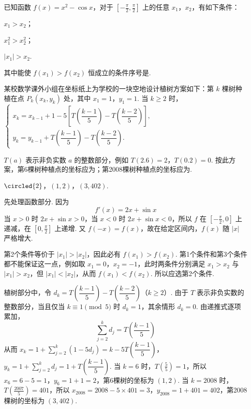 \begin{problem}
已知函数 \( f(x) = x^2 - \cos x \)，对于 \( \left[-\frac{\pi}{2}, \frac{\pi}{2}\right] \) 上的任意 \(x_1\)，\(x_2\)，有如下条件：

\begin{circlelist}
\item \( x_1 > x_2 \)；
\item \( x_1^2 > x_2^2 \)；
\item \( |x_1| > x_2 \).
\end{circlelist}

其中能使 \( f(x_1) > f(x_2) \) 恒成立的条件序号是\fillinblank{}.

某校数学课外小组在坐标纸上为学校的一块空地设计植树方案如下：第 \( k \) 棵树种植在点 \( P_k(x_k,y_k) \) 处，其中 \( x_1=1 \)，\( y_1=1 \). 当 \( k\geqslant2 \) 时，
\(\begin{cases}
x_k=x_{k-1}+1-5\left[T\left(\dfrac{k-1}{5}\right)-T\left(\dfrac{k-2}{5}\right)\right],\\
y_k=y_{k-1}+T\left(\dfrac{k-1}{5}\right)-T\left(\dfrac{k-2}{5}\right).
\end{cases}\)

\( T(a) \) 表示非负实数 \( a \) 的整数部分，例如 \( T(2.6)=2 \)，\( T(0.2)=0 \). 按此方案，第6棵树种植点的坐标应为\fillinblank{}；第2008棵树种植点的坐标应为\fillinblank{}.
\end{problem}

\begin{answer}
\(\circled{2}\)，\((1,2)\)，\((3,402)\).
\end{answer}

\begin{solution}
先处理函数部分. 因为
\[
f'(x)=2x+\sin x
\]
当 \(x>0\) 时 \(2x+\sin x>0\)，当 \(x<0\) 时 \(2x+\sin x<0\)，所以 \(f\) 在 \([-\frac\pi2,0]\) 上递减，在 \([0,\frac\pi2]\) 上递增. 又 \(f(-x)=f(x)\)，故在给定区间内，\(f(x)\) 随 \(|x|\) 严格增大.

第2个条件等价于 \(|x_1|>|x_2|\)，因此必有 \(f(x_1)>f(x_2)\). 第1个条件和第3个条件都不能保证这一点，例如取 \(x_1=0\)，\(x_2=-1\)，此时两条件分别满足 \(x_1>x_2\) 与 \(|x_1|>x_2\)，但 \(|x_1|<|x_2|\)，从而 \(f(x_1)<f(x_2)\). 所以应选第2个条件.

植树部分中，令 \(d_k=T\left(\dfrac{k-1}{5}\right)-T\left(\dfrac{k-2}{5}\right)\)（\(k\geqslant2\)）. 由于 \(T\) 表示非负实数的整数部分，当且仅当 \(k\equiv1\pmod 5\) 时 \(d_k=1\)，其余情形 \(d_k=0\). 由递推式逐项累加，
\[
\sum_{j=2}^{k}d_j=T\left(\dfrac{k-1}{5}\right)
\]
从而
\(x_k=1+\sum_{j=2}^{k}(1-5d_j)=k-5T\left(\dfrac{k-1}{5}\right)\)，\(y_k=1+\sum_{j=2}^{k}d_j=1+T\left(\dfrac{k-1}{5}\right)\).
当 \(k=6\) 时，\(T(\frac{5}{5})=1\)，所以 \(x_6=6-5=1\)，\(y_6=1+1=2\)，第6棵树的坐标为 \((1,2)\). 当 \(k=2008\) 时，\(T(\frac{2007}{5})=401\)，所以 \(x_{2008}=2008-5\times401=3\)，\(y_{2008}=1+401=402\)，第2008棵树的坐标为 \((3,402)\).
\end{solution}

